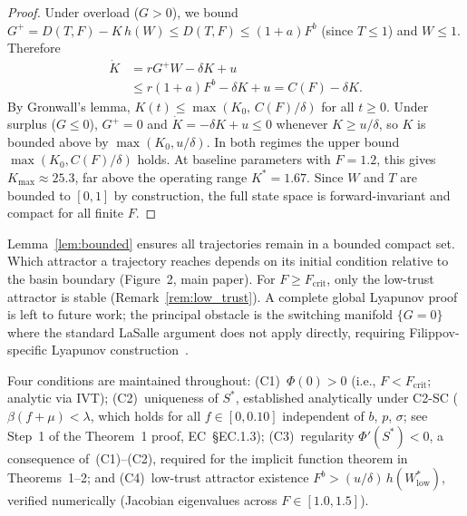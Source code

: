 \documentclass[msom,dblanonrev]{informs4}
\begin{document}
\begin{proof}
Under overload ($G > 0$), we bound $G^+ = D(T,F) - K\,h(W) \leq D(T,F) \leq (1+a)F^b$ (since $T \leq 1$) and $W \leq 1$. Therefore
\begin{align*}
  \dot{K} &= r G^+ W - \delta K + u \\
    &\leq r(1+a)F^b - \delta K + u = C(F) - \delta K.
\end{align*}
By Gronwall's lemma, $K(t) \leq \max(K_0,\, C(F)/\delta)$ for all $t \geq 0$. Under surplus ($G \leq 0$), $G^+=0$ and $\dot{K} = -\delta K + u \leq 0$ whenever $K \geq u/\delta$, so $K$ is bounded above by $\max(K_0, u/\delta)$. In both regimes the upper bound $\max(K_0, C(F)/\delta)$ holds. At baseline parameters with $F = 1.2$, this gives $K_{\max} \approx 25.3$, far above the operating range $K^* = 1.67$. Since $W$ and $T$ are bounded to $[0,1]$ by construction, the full state space is forward-invariant and compact for all finite $F$. \Halmos
\end{proof}

\begin{remark}\label{rem:global_conv}
Lemma~\ref{lem:bounded} ensures all trajectories remain in a bounded compact set. Which attractor a trajectory reaches depends on its initial condition relative to the basin boundary (Figure~2, main paper). For $F \geq F_{\mathrm{crit}}$, only the low-trust attractor is stable (Remark~\ref{rem:low_trust}). A complete global Lyapunov proof is left to future work; the principal obstacle is the switching manifold $\{G{=}0\}$ where the standard LaSalle argument does not apply directly, requiring Filippov-specific Lyapunov construction~\citep{filippov1988differential}.
\end{remark}

\begin{remark}\label{rem:conditions}
Four conditions are maintained throughout: (C1)~$\Phi(0) > 0$ (i.e., $F < F_{\mathrm{crit}}$; analytic via IVT); (C2)~uniqueness of $S^*$, established analytically under C2-SC ($\beta(f+\mu)<\lambda$, which holds for all $f\in[0,0.10]$ independent of $b$, $p$, $\sigma$; see Step~1 of the Theorem~1 proof, EC~\S EC.1.3); (C3)~regularity $\Phi'(S^*) < 0$, a consequence of~(C1)--(C2), required for the implicit function theorem in Theorems~1--2; and (C4)~low-trust attractor existence $F^b > (u/\delta)\,h(W^*_{\mathrm{low}})$, verified numerically (Jacobian eigenvalues across $F \in [1.0, 1.5]$).
\end{remark}
\end{document}
